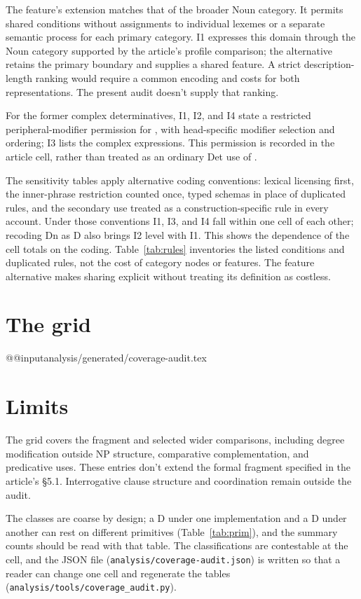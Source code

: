 \documentclass[12pt]{article}
\makeatletter
\newcommand{\tablebody}[1]{\csname @@input\endcsname #1 }
\makeatother
\begin{document}
The feature's extension matches that of the broader Noun category. It permits shared conditions without assignments to individual lexemes or a separate semantic process for each primary category. I1 expresses this domain through the Noun category supported by the article's profile comparison; the alternative retains the primary boundary and supplies a shared feature. A strict description-length ranking would require a common encoding and costs for both representations. The present audit doesn't supply that ranking.

For the former complex determinatives, I1, I2, and I4 state a restricted peripheral-modifier permission for , with head-specific modifier selection and ordering; I3 lists the complex expressions. This permission is recorded in the article cell, rather than treated as an ordinary Det use of .

The sensitivity tables apply alternative coding conventions: lexical licensing first, the inner-phrase restriction counted once, typed schemas in place of duplicated rules, and the secondary use treated as a construction-specific rule in every account. Under those conventions I1, I3, and I4 fall within one cell of each other; recoding Dn as D also brings I2 level with I1. This shows the dependence of the cell totals on the coding. Table~\ref{tab:rules} inventories the listed conditions and duplicated rules, not the cost of category nodes or features. The feature alternative makes sharing explicit without treating its definition as costless.

\section{The grid}

\tablebody{analysis/generated/coverage-audit.tex}

\section{Limits}

The grid covers the fragment and selected wider comparisons, including degree modification outside NP structure, comparative complementation, and predicative uses. These entries don't extend the formal fragment specified in the article's §5.1. Interrogative clause structure and coordination remain outside the audit.

The classes are coarse by design; a D under one implementation and a D under another can rest on different primitives (Table~\ref{tab:prim}), and the summary counts should be read with that table. The classifications are contestable at the cell, and the JSON file (\texttt{analysis/coverage-audit.json}) is written so that a reader can change one cell and regenerate the tables (\texttt{analysis/tools/coverage\_audit.py}).

\printbibliography
\end{document}

